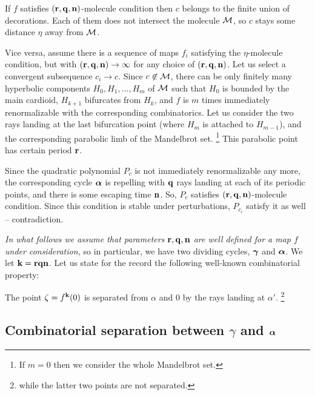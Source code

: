 \begin{pf}
  If $f$ satisfies $({\mathbf{r}},{\mathbf{q}},{\mathbf{n}})$-molecule condition then $c$ belongs to the finite union of decorations.
Each of them does not intersect the molecule ${\mathcal M}$, so $c$ stays some distance $\eta$ away from ${\mathcal M}$. 

Vice versa, assume there is a sequence of maps $f_i$ satisfying the $\eta$-molecule condition,
but with  $({\mathbf{r}},{\mathbf{q}},{\mathbf{n}})\to \infty$ for any choice of $({\mathbf{r}},{\mathbf{q}},{\mathbf{n}})$.
Let us select a convergent subsequence $c_i\to c$. Since $c\not\in {\mathcal M}$, 
there can be only finitely many hyperbolic components $H_0,H_1,\dots,H_m$ of ${\mathcal M}$
such that $H_0$ is bounded by the main cardioid, $H_{k+1}$ bifurcates from $H_k$,
and $f$ is $m$ times immediately  renormalizable with the corresponding combinatorics.   
Let us consider the two rays landing at the last bifurcation point (where $H_m$ is attached to $H_{m-1}$),
and the corresponding parabolic limb of the Mandelbrot set.%
\footnote{If $m=0$ then we consider the whole Mandelbrot set. } 
This parabolic point has certain period ${\mathbf{r}}$. 

Since the quadratic polynomial $P_c$ is not immediately renormalizable any more,
the corresponding cycle ${\mbox{\boldmath$\alpha$} }$ is repelling with ${\mathbf{q}}$ rays landing at each of  its periodic points,
and there is some escaping time ${\mathbf{n}}$. 
So, $P_c$ satisfies $({\mathbf{r}},{\mathbf{q}},{\mathbf{n}})$-molecule condition.
Since this condition is stable under perturbations, $P_{c_i}$ satisfy it as well -- contradiction.  
\end{pf}


{\it In what follows we assume that parameters ${\mathbf{r}},{\mathbf{q}},{\mathbf{n}}$ are well defined for a map $f$ under consideration,}
so in particular, we have two dividing cycles, ${\mbox{\boldmath$\gamma$} }$ and ${\mbox{\boldmath$\alpha$} }$. 
We let ${\mathbf{k}}={\mathbf{r}}{\mathbf{q}}{\mathbf{n}}$.
Let us state for the record the following well-known combinatorial property:

\begin{lem}\label{zeta}
   The point $\zeta=f^{\mathbf{k}}(0)$ is separated from $\alpha$ and $0$ by the rays landing at $\alpha'$.%
\footnote{while the latter two points are not separated.}
\end{lem}

 \subsection{Combinatorial separation between $\gamma$ and ${\mbox{\boldmath$\alpha$} }$}\label{comb sep} 
  
